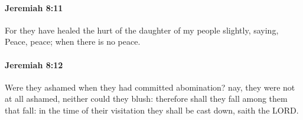 		\paragraph{Jeremiah 8:11} %
			\label{JEREMIAH-8-11}

			For they have healed the hurt of the daughter of my people slightly, saying, Peace, peace; when there is no peace.


		\paragraph{Jeremiah 8:12} %
			\label{JEREMIAH-8-12}

			Were they ashamed when they had committed abomination? nay, they were not at all ashamed, neither could they blush: therefore shall they fall among them that fall: in the time of their visitation they shall be cast down, saith the LORD.


